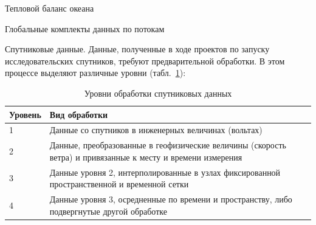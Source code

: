 \begin{chapter}{Тепловой баланс океана}
\begin{section}{Глобальные комплекты данных по потокам}
\begin{paragraph}{Спутниковые данные.}
Данные, полученные в ходе проектов по запуску исследовательских спутников,
требуют предварительной обработки. В этом процессе выделяют различные 
уровни (табл.~\ref{tbl:DataProcLvl}):
%
\begin{table}[h]
\caption{Уровни обработки спутниковых данных}\label{tbl:DataProcLvl}
\begin{tabular}{lp{}}
\hline
Уровень & Вид обработки\\
\hline
1       & Данные со спутников в инженерных величинах (вольтах)\\
2       & Данные, преобразованные в геофизические величины (скорость ветра)
          и привязанные к месту и времени измерения\\
3       & Данные уровня 2, интерполированные в узлах фиксированной 
          пространственной и временной сетки\\
4       & Данные уровня 3, осредненные по времени и пространству, либо 
          подвергнутые другой обработке\\
\hline
\end{tabular}
\end{table}
%


\end{paragraph}
\end{section}
\end{chapter}
